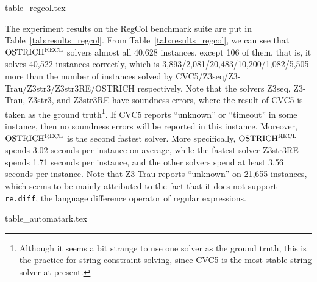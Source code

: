 \begin{table}[ht]
\vspace{-3mm}
\begin{center}
  {table_regcol.tex}
\end{center}
  \caption{Experiment results on RegCol, with timeout = 60 seconds}
  \label{tab:results_regcol}
\vspace{-6mm}
\end{table}

The experiment results on the RegCol benchmark suite are put in Table~\ref{tab:results_regcol}. 
From Table~\ref{tab:results_regcol}, we can see that $\rm OSTRICH^{RECL}$ solvers almost all 40,628 instances, except 106 of them, that is, it solves 40,522 instances correctly, which is %
3,893/2,081/20,483/10,200/1,082/5,505 more than the number of instances solved by CVC5/Z3seq/Z3-Trau/Z3str3/Z3str3RE/OSTRICH respectively. 
%    
Note that the solvers  Z3seq, Z3-Trau, Z3str3, and Z3str3RE have soundness errors, where the result of CVC5 is taken as the ground truth\footnote{Although it seems a bit strange to use one solver as the ground truth, this is the practice for string constraint solving, since CVC5 is the most stable string solver at present.}. If CVC5 reports ``unknown'' or ``timeout'' in some instance, then no soundness errors will be reported in this instance. 
%
Moreover, $\rm OSTRICH^{RECL}$ is the second fastest solver. More specifically, $\rm OSTRICH^{RECL}$ spends 3.02 seconds per instance on average, while the fastest solver Z3str3RE spends 1.71 seconds per instance, and the other solvers spend at least 3.56 seconds per instance.  
Note that Z3-Trau reports ``unknown'' on 21,655 instances, which seems to be mainly attributed to the fact that it does not support \verb|re.diff|, the language difference operator of regular expressions. 


\begin{table}[ht]
\begin{center}
  {table_automatark.tex}
\end{center}
  \caption{Experiment results on AutomatArk, with timeout = 60 seconds}
  \label{tab:results_automatark}
\vspace{-6mm}
\end{table}

